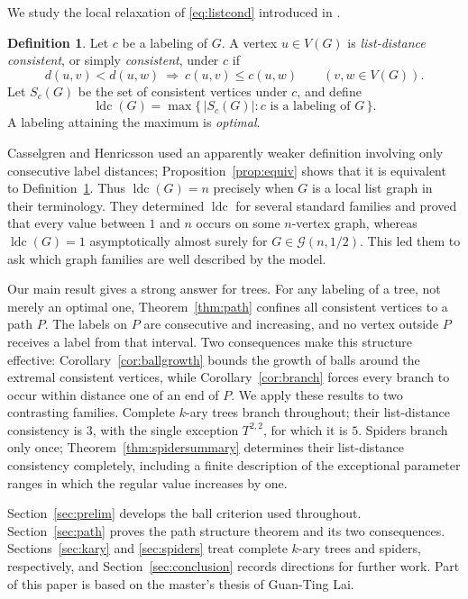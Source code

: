 \documentclass[reqno,10pt]{article}
\theoremstyle{definition}
\newtheorem{definition}[theorem]{Definition}
\numberwithin{equation}{section}
\numberwithin{theorem}{section}
\newcommand{\ldc}{\operatorname{ldc}}
\begin{document}
We study the local relaxation of \eqref{eq:listcond} introduced in
\cite{CH2025}.

\begin{definition}
\label{def:ldc}
Let $c$ be a labeling of $G$. A vertex $u\in V(G)$ is
\emph{list-distance consistent}, or simply \emph{consistent}, under $c$ if
\begin{equation}
 d(u,v)<d(u,w)\ \Longrightarrow\ c(u,v)\le c(u,w)
 \qquad (v,w\in V(G)).
 \label{eq:ldc}
\end{equation}
Let $S_c(G)$ be the set of consistent vertices under $c$, and define
\[
 \ldc(G)=\max\{\,|S_c(G)|:c\text{ is a labeling of }G\,\}.
\]
A labeling attaining the maximum is \emph{optimal}.
\end{definition}

Casselgren and Henricsson used an apparently weaker definition involving only
consecutive label distances; Proposition~\ref{prop:equiv} shows that it is
equivalent to Definition~\ref{def:ldc}. Thus $\ldc(G)=n$ precisely when $G$ is
a local list graph in their terminology. They determined $\ldc$ for several
standard families and proved that every value between $1$ and $n$ occurs on
some $n$-vertex graph, whereas $\ldc(G)=1$ asymptotically almost surely for
$G\in\mathcal G(n,1/2)$. This led them to ask which graph families are well
described by the model.

Our main result gives a strong answer for trees. For any labeling of a tree,
not merely an optimal one, Theorem~\ref{thm:path} confines all consistent
vertices to a path $P$. The labels on $P$ are consecutive and increasing, and
no vertex outside $P$ receives a label from that interval. Two consequences
make this structure effective: Corollary~\ref{cor:ballgrowth} bounds the growth
of balls around the extremal consistent vertices, while
Corollary~\ref{cor:branch} forces every branch to occur within distance one of
an end of $P$. We apply these results to two contrasting families. Complete
$k$-ary trees branch throughout; their list-distance consistency is $3$, with
the single exception $T^{2,2}$, for which it is $5$. Spiders branch only once;
Theorem~\ref{thm:spidersummary} determines their list-distance consistency
completely, including a finite description of the exceptional parameter
ranges in which the regular value increases by one.

Section~\ref{sec:prelim} develops the ball criterion used throughout.
Section~\ref{sec:path} proves the path structure theorem and its two
consequences. Sections~\ref{sec:kary} and \ref{sec:spiders} treat complete
$k$-ary trees and spiders, respectively, and Section~\ref{sec:conclusion}
records directions for further work. Part of this paper is based on the
master's thesis \cite{Lai2025} of Guan-Ting Lai.
\end{document}
